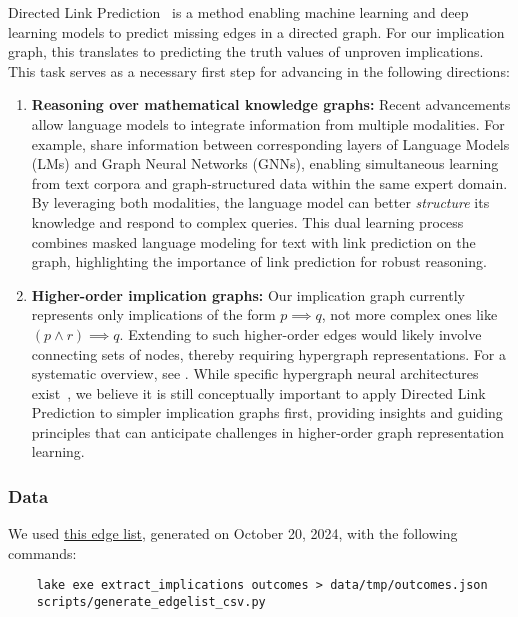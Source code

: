 Directed Link Prediction~\cite{Kipf2016} is a method enabling machine learning and deep learning
models to predict missing edges in a directed graph. For our implication graph, this translates to
predicting the truth values of unproven implications. This task serves as a necessary first step
for advancing in the following directions:

\begin{enumerate}
    \item \textbf{Reasoning over mathematical knowledge graphs:} Recent advancements allow language
    models to integrate information from multiple modalities. For example,
    \cite{Zhang2022, Yasunaga2022} share information between corresponding layers of Language Models (LMs)
    and Graph Neural Networks (GNNs), enabling simultaneous learning from text corpora and graph-structured
    data within the same expert domain. By leveraging both modalities, the language model can better
    \emph{structure} its knowledge and respond to complex queries. This dual learning process combines
    masked language modeling for text with link prediction on the graph, highlighting the importance
    of link prediction for robust reasoning.
    \item \textbf{Higher-order implication graphs:} Our implication graph currently represents only
    implications of the form $p \implies q$, not more complex ones like $(p \land r) \implies q$.
    Extending to such higher-order edges would likely involve connecting sets of nodes, thereby
    requiring hypergraph representations. For a systematic overview, see \cite{Kivela2014}.
    While specific hypergraph neural architectures exist~\cite{Feng2019}, we believe it is still
    conceptually important to apply Directed Link Prediction to simpler implication graphs first,
    providing insights and guiding principles that can anticipate challenges in higher-order graph
    representation learning.
\end{enumerate}

\subsubsection{Data}

We used \href{https://github.com/teorth/equational_theories/blob/main/data/2024-10-20-edge_list.csv.zip}{this edge list},
generated on October 20, 2024, with the following commands:

\begin{verbatim}
    lake exe extract_implications outcomes > data/tmp/outcomes.json
    scripts/generate_edgelist_csv.py
\end{verbatim}

